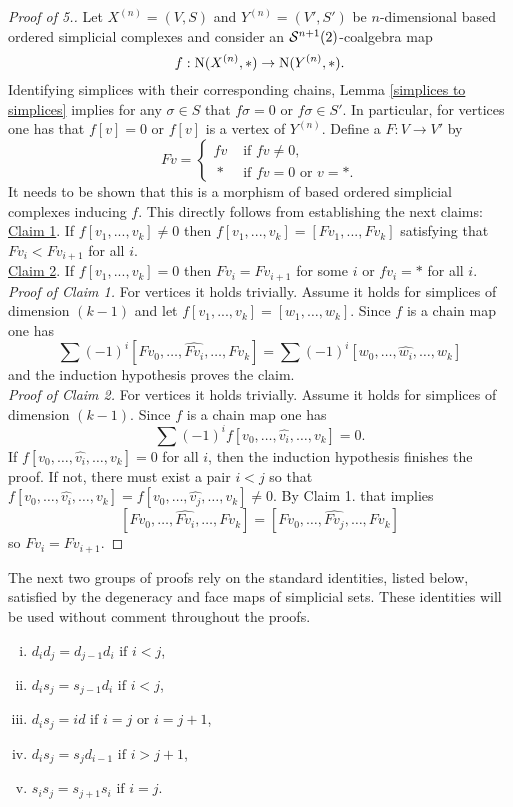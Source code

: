 \documentclass[thesis.tex]{subfiles}
\begin{document}
\begin{proof}[Proof of 5.]
Let $X^{(n)}=(V,S)$ and $Y^{(n)}=(V',S')$ be $n$-dimensional based ordered simplicial complexes and consider an $\S^{n+1}(2)$-coalgebra map $$f:\chains(X^{(n)},\ast)\to\chains(Y^{(n)},\ast).$$
Identifying simplices with their corresponding chains, Lemma \ref{simplices to simplices} implies for any $\sigma\in S$ that $f\sigma=0$ or $f\sigma\in S'$. In particular, for vertices one has that $f[v]=0$ or $f[v]$ is a vertex of $Y^{(n)}$. Define a $F:V\to V'$ by
$$Fv=\begin{cases}fv & \text{ if } fv\neq0, \\ \ \ast & \text{ if } fv=0 \text{ or } v=\ast.\end{cases}$$
It needs to be shown that this is a morphism of based ordered simplicial complexes inducing $f$. This directly follows from establishing the next \vspace*{5pt}claims:
\underline{Claim 1}. If $f[v_1,...,v_k]\neq0$ then $f[v_1,...,v_k]=[Fv_1,...,Fv_k]$ satisfying that $Fv_i<Fv_{i+1}$ for all $i$. \vspace*{5pt} \\
\underline{Claim 2}. If $f[v_1,...,v_k]=0$ then $Fv_{i}=Fv_{i+1}$ for some $i$ or $fv_i=\ast$ for all $i$.\vspace*{9pt} \\
\textit{Proof of Claim 1.} For vertices it holds trivially. Assume it holds for simplices of dimension $(k-1)$ and let $f[v_1,...,v_k]=[w_1,\dotsc,w_k]$. Since $f$ is a chain map one has
$$\sum(-1)^i[Fv_0,\dotsc,\widehat{Fv_i},\dotsc,Fv_k]=\sum(-1)^i[w_0,\dotsc,\widehat{w_i},\dotsc,w_k]$$
and the induction hypothesis proves the claim.\vspace*{9pt} \\
\textit{Proof of Claim 2.} For vertices it holds trivially. Assume it holds for simplices of dimension $(k-1)$. Since $f$ is a chain map one has
$$\sum(-1)^if[v_0,\dotsc,\widehat{v_i},\dotsc,v_k]=0.$$
If $f[v_0,\dotsc,\widehat{v_i},\dotsc,v_k]=0$ for all $i$, then the induction hypothesis finishes the proof. If not, there must exist a pair $i<j$ so that $f[v_0,\dotsc,\widehat{v_i},\dotsc,v_k]=f[v_0,\dotsc,\widehat{v_j},\dotsc,v_k]\neq0$. By Claim 1. that implies $$[Fv_0,\dotsc,\widehat{Fv_i},\dotsc,Fv_k]=[Fv_0,\dotsc,\widehat{Fv_j},\dotsc,Fv_k]$$ so $Fv_i=Fv_{i+1}$.
\end{proof}

The next two groups of proofs rely on the standard identities, listed below, satisfied by the degeneracy and face maps of simplicial sets. These identities will be used without comment throughout the proofs.
\begin{enumerate}[i)]
\item $d_i d_j = d_{j-1} d_i \text{ if } i < j$,
\item $d_i s_j = s_{j-1} d_i \text{ if } i < j$,
\item $d_i s_j = id \text{ if } i = j \text{ or } i = j + 1$,
\item $d_i s_j = s_j d_{i-1} \text{ if } i > j + 1$,
\item $s_i s_j = s_{j+1} s_i \text{ if } i = j$.
\end{enumerate}
\end{document}
